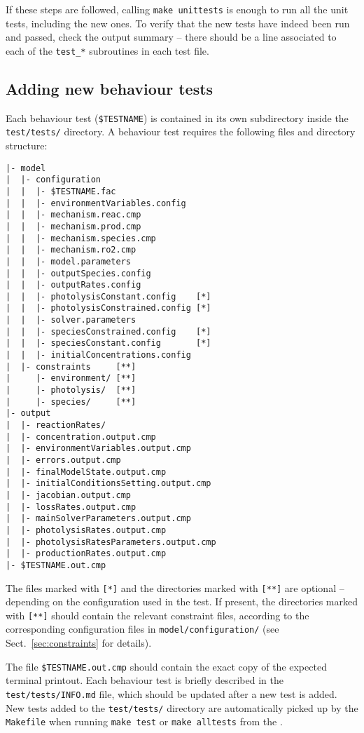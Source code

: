 If these steps are followed, calling \texttt{make\ unittests} is
enough to run all the unit tests, including the new ones. To verify
that the new tests have indeed been run and passed, check the output
summary -- there should be a line associated to each of the
\texttt{test\_*} subroutines in each test file.

\subsection{Adding new behaviour tests} \label{subsec:adding-new-behaviour-tests}

Each behaviour test (\texttt{\$TESTNAME}) is contained in its own
subdirectory inside the \texttt{test/tests/} directory. A behaviour
test requires the following files and directory structure:

\begin{verbatim}
|- model
|  |- configuration
|  |  |- $TESTNAME.fac
|  |  |- environmentVariables.config
|  |  |- mechanism.reac.cmp
|  |  |- mechanism.prod.cmp
|  |  |- mechanism.species.cmp
|  |  |- mechanism.ro2.cmp
|  |  |- model.parameters
|  |  |- outputSpecies.config
|  |  |- outputRates.config
|  |  |- photolysisConstant.config    [*]
|  |  |- photolysisConstrained.config [*]
|  |  |- solver.parameters
|  |  |- speciesConstrained.config    [*]
|  |  |- speciesConstant.config       [*]
|  |  |- initialConcentrations.config
|  |- constraints     [**]
|     |- environment/ [**]
|     |- photolysis/  [**]
|     |- species/     [**]
|- output
|  |- reactionRates/
|  |- concentration.output.cmp
|  |- environmentVariables.output.cmp
|  |- errors.output.cmp
|  |- finalModelState.output.cmp
|  |- initialConditionsSetting.output.cmp
|  |- jacobian.output.cmp
|  |- lossRates.output.cmp
|  |- mainSolverParameters.output.cmp
|  |- photolysisRates.output.cmp
|  |- photolysisRatesParameters.output.cmp
|  |- productionRates.output.cmp
|- $TESTNAME.out.cmp
\end{verbatim}

The files marked with \texttt{[*]} and the directories marked with
\texttt{[**]} are optional -- depending on the configuration used in
the test. If present, the directories marked with \texttt{[**]} should
contain the relevant constraint files, according to the corresponding
configuration files in \texttt{model/configuration/} (see
Sect.~\ref{sec:constraints} for details).

The file \texttt{\$TESTNAME.out.cmp} should contain the exact copy of
the expected terminal printout. Each behaviour test is briefly
described in the \texttt{test/tests/INFO.md} file, which should be
updated after a new test is added. New tests added to the
\texttt{test/tests/} directory are automatically picked up by the
\texttt{Makefile} when running \verb|make test| or \verb|make alltests|
from the \maindir.

